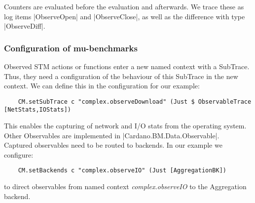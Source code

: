 Counters are evaluated before the evaluation and afterwards. We trace these as
log items |ObserveOpen| and |ObserveClose|, as well as the difference
with type |ObserveDiff|.

\subsubsection{Configuration of mu-benchmarks}

Observed STM actions or functions enter a new named context with a SubTrace.
Thus, they need a configuration of the behaviour of this SubTrace in the new
context. We can define this in the configuration for our example:
\begin{verbatim}
    CM.setSubTrace c "complex.observeDownload" (Just $ ObservableTrace [NetStats,IOStats])
\end{verbatim}

This enables the capturing of network and I/O stats from the operating system.
Other Observables are implemented in |Cardano.BM.Data.Observable|.
\\
Captured observables need to be routed to backends. In our example we configure:
\begin{verbatim}
    CM.setBackends c "complex.observeIO" (Just [AggregationBK])
\end{verbatim}
to direct observables from named context \emph{complex.observeIO} to the
Aggregation backend.
